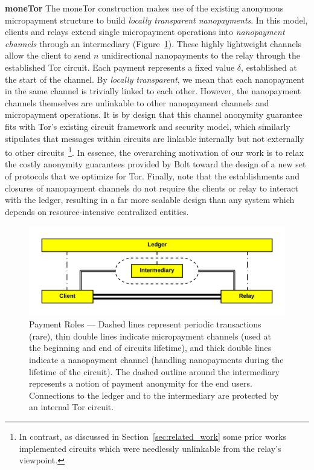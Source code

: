 \medskip \noindent\textbf{moneTor} The moneTor construction makes use of the existing anonymous micropayment structure to build \emph{locally transparent nanopayments}.
In this model, clients and relays extend single micropayment operations into \emph{nanopayment channels} through an intermediary (Figure~\ref{fig:parties}).
These highly lightweight channels allow the client to send $n$ unidirectional nanopayments to the relay through the established Tor circuit.
Each payment represents a fixed value $\delta$, established at the start of the channel.
By \emph{locally transparent}, we mean that each nanopayment in the same channel is trivially linked to each other.
However, the nanopayment channels themselves are unlinkable to other nanopayment channels and micropayment operations.
It is by design that this channel anonymity guarantee fits with Tor's existing circuit framework and security model, which similarly stipulates that messages within circuits are linkable internally but not externally to other circuits~\footnote{In contrast, as discussed in Section~\ref{sec:related_work} some prior works implemented circuits which were needlessly unlinkable from the relay's viewpoint.}.
In essence, the overarching motivation of our work is to relax the costly anonymity guarantees provided by Bolt toward the design of a new set of protocols that we optimize for Tor.
Finally, note that the establishments and closures of nanopayment channels do not require the clients or relay to interact with the ledger, resulting in a far more scalable design than any system which depends on resource-intensive centralized entities.

\begin{figure}[h] \centering
  \includegraphics[trim={0.5cm, 0.5cm, 0.5cm, 0.5cm}, clip,
    scale=0.6]{images/party_diagram.png}
  \caption[Payment Roles]{Payment Roles --- Dashed lines represent periodic transactions (rare), thin double lines indicate micropayment channels (used at the beginning and end of circuits lifetime), and thick double lines indicate a nanopayment channel (handling nanopayments during the lifetime of the circuit).
    The dashed outline around the intermediary represents a notion of payment anonymity for the end users.
    Connections to the ledger and to the intermediary are protected by an internal Tor circuit.}
  \label{fig:parties}
\end{figure}

